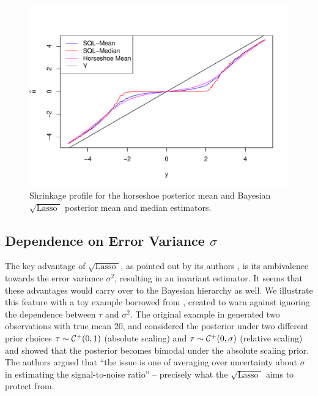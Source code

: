 \documentclass[chapters]{uamaththesis}
\def\sql{$\sqrt{\text{Lasso }}$}
\begin{document}
\begin{figure}[!ht]%
\centering
\includegraphics[width=0.7\columnwidth]{art/shrinkage_profile}%
\caption{Shrinkage profile for the horseshoe posterior mean and Bayesian \sql{} posterior mean and median estimators. }%
\label{fig:profile}%
\end{figure}


\subsection{Dependence on Error Variance $\sigma$}

The key advantage of \sql{}, as pointed out by its authors \citep{belloni2011square}, is its ambivalence towards the error variance $\sigma^2$, resulting in an invariant estimator. It seems that these advantages would carry over to the Bayesian hierarchy as well. We illustrate this feature with a toy example borrowed from \citet{polson2010shrink}, created to warn against ignoring the dependence between $\tau$ and $\sigma^2$. The original example in \citet{polson2010shrink} generated two observations with true mean $20$, and considered the posterior under two different prior choices $\tau \sim \mathcal{C}^{+}(0,1)$ (absolute scaling) and $\tau \sim \mathcal{C}^{+}(0,\sigma)$ (relative scaling) and showed that the posterior becomes bimodal under the absolute scaling prior. The authors argued that ``the issue is one of averaging over uncertainty about $\sigma$ in estimating the signal-to-noise ratio'' -- precisely what the \sql{} aims to protect from. 
\end{document}
